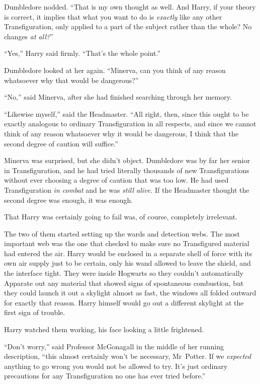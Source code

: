 Dumbledore nodded. “That is my own thought as well. And Harry, if your theory is correct, it implies that what you want to do is \emph{exactly} like any other Transfiguration, only applied to a part of the subject rather than the whole? No changes \emph{at all?}”

“Yes,” Harry said firmly. “That’s the whole point.”

Dumbledore looked at her again. “Minerva, can you think of any reason whatsoever why that would be dangerous?”

“No,” said Minerva, after she had finished searching through her memory.

“Likewise myself,” said the Headmaster. “All right, then, since this ought to be exactly analogous to ordinary Transfiguration in all respects, and since we cannot think of any reason whatsoever why it would be dangerous, I think that the second degree of caution will suffice.”

Minerva was surprised, but she didn’t object. Dumbledore was by far her senior in Transfiguration, and he had tried literally thousands of new Transfigurations without ever choosing a degree of caution that was too low. He had used Transfiguration \emph{in combat} and he was \emph{still alive.} If the Headmaster thought the second degree was enough, it was enough.

That Harry was certainly going to fail was, of course, completely irrelevant.

The two of them started setting up the wards and detection webs. The most important web was the one that checked to make sure no Transfigured material had entered the air. Harry would be enclosed in a separate shell of force with its own air supply just to be certain, only his wand allowed to leave the shield, and the interface tight. They were inside Hogwarts so they couldn’t automatically Apparate out any material that showed signs of spontaneous combustion, but they could launch it out a skylight almost as fast, the windows all folded outward for exactly that reason. Harry himself would go out a different skylight at the first sign of trouble.

Harry watched them working, his face looking a little frightened.

“Don’t worry,” said Professor McGonagall in the middle of her running description, “this almost certainly won’t be necessary, Mr~Potter. If we \emph{expected} anything to go wrong you would not be allowed to try. It’s just ordinary precautions for any Transfiguration no one has ever tried before.”

